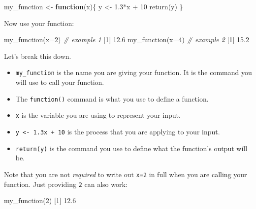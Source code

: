 \documentclass[
]{book}
\newenvironment{Shaded}{\begin{snugshade}}{\end{snugshade}}
\newcommand{\AttributeTok}[1]{\textcolor[rgb]{0.77,0.63,0.00}{#1}}
\newcommand{\CommentTok}[1]{\textcolor[rgb]{0.56,0.35,0.01}{\textit{#1}}}
\newcommand{\ControlFlowTok}[1]{\textcolor[rgb]{0.13,0.29,0.53}{\textbf{#1}}}
\newcommand{\DecValTok}[1]{\textcolor[rgb]{0.00,0.00,0.81}{#1}}
\newcommand{\FloatTok}[1]{\textcolor[rgb]{0.00,0.00,0.81}{#1}}
\newcommand{\FunctionTok}[1]{\textcolor[rgb]{0.00,0.00,0.00}{#1}}
\newcommand{\NormalTok}[1]{#1}
\newcommand{\OtherTok}[1]{\textcolor[rgb]{0.56,0.35,0.01}{#1}}
\newcommand{\SpecialCharTok}[1]{\textcolor[rgb]{0.00,0.00,0.00}{#1}}
\providecommand{\tightlist}{%
  \setlength{\itemsep}{0pt}\setlength{\parskip}{0pt}}
\begin{document}
\begin{Shaded}
\begin{Highlighting}[]
\NormalTok{my\_function }\OtherTok{\textless{}{-}} \ControlFlowTok{function}\NormalTok{(x)\{}
\NormalTok{  y }\OtherTok{\textless{}{-}} \FloatTok{1.3}\SpecialCharTok{*}\NormalTok{x }\SpecialCharTok{+} \DecValTok{10}
  \FunctionTok{return}\NormalTok{(y)}
\NormalTok{\}}
\end{Highlighting}
\end{Shaded}

Now use your function:

\begin{Shaded}
\begin{Highlighting}[]
\FunctionTok{my\_function}\NormalTok{(}\AttributeTok{x=}\DecValTok{2}\NormalTok{) }\CommentTok{\# example 1}
\NormalTok{[}\DecValTok{1}\NormalTok{] }\FloatTok{12.6}
\FunctionTok{my\_function}\NormalTok{(}\AttributeTok{x=}\DecValTok{4}\NormalTok{) }\CommentTok{\# example 2}
\NormalTok{[}\DecValTok{1}\NormalTok{] }\FloatTok{15.2}
\end{Highlighting}
\end{Shaded}

Let's break this down.

\begin{itemize}
\tightlist
\item
  \texttt{my\_function} is the name you are giving your function. It is the command you will use to call your function.
\item
  The \texttt{function()} command is what you use to define a function.
\item
  \texttt{x} is the variable you are using to represent your input.
\item
  \texttt{y\ \textless{}-\ 1.3x\ +\ 10} is the process that you are applying to your input.
\item
  \texttt{return(y)} is the command you use to define what the function's output will be.
\end{itemize}

Note that you are not \emph{required} to write out \texttt{x=2} in full when you are calling your function. Just providing \texttt{2} can also work:

\begin{Shaded}
\begin{Highlighting}[]
\FunctionTok{my\_function}\NormalTok{(}\DecValTok{2}\NormalTok{)}
\NormalTok{[}\DecValTok{1}\NormalTok{] }\FloatTok{12.6}
\end{Highlighting}
\end{Shaded}
\end{document}
